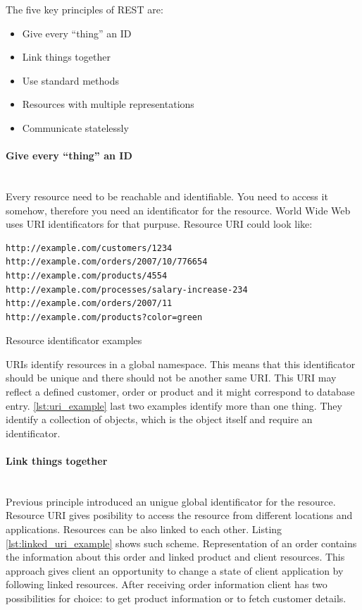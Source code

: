 The  five key principles of REST are\cite{rest_brief_intro}:
\begin{itemize}
  
 \item Give every “thing” an ID
 \item Link things together
 \item Use standard methods
 \item Resources with multiple representations
 \item Communicate statelessly
  
\end{itemize}

\paragraph{Give every “thing” an ID}  ~\\

Every resource need to be reachable and identifiable. You need to access it
somehow, therefore you need an identificator for the resource. World Wide Web
uses \gls{URI} identificators for that purpuse. Resource \gls{URI} could look like:

\begin{listing}[H]
\begin{verbatim}
http://example.com/customers/1234
http://example.com/orders/2007/10/776654
http://example.com/products/4554
http://example.com/processes/salary-increase-234 
http://example.com/orders/2007/11
http://example.com/products?color=green
\end{verbatim}
\caption{Resource identificator examples \cite{rest_brief_intro}}
\label{lst:uri_example}
\end{listing}

URIs identify resources in a global namespace. This means that this
identificator should be unique and there should not be another same URI.
This URI may reflect a defined customer, order or product and it might correspond
to database entry. \autoref{lst:uri_example} last two examples identify more
than one thing. They identify a collection of objects, which is the object
itself and require an identificator.

\paragraph{Link things together}  ~\\

Previous principle introduced an unigue global identificator for the resource.
Resource URI gives posibility to access the resource from different locations
and applications. Resources can be also linked to each other.
Listing \ref{lst:linked_uri_example} shows such scheme. Representation of an
order contains the information about this order and linked product and client resources.
This approach gives client an opportunity to change a state of client application by following linked
resources. After receiving order information client has two possibilities for
choice: to get product information or to fetch customer details. 

